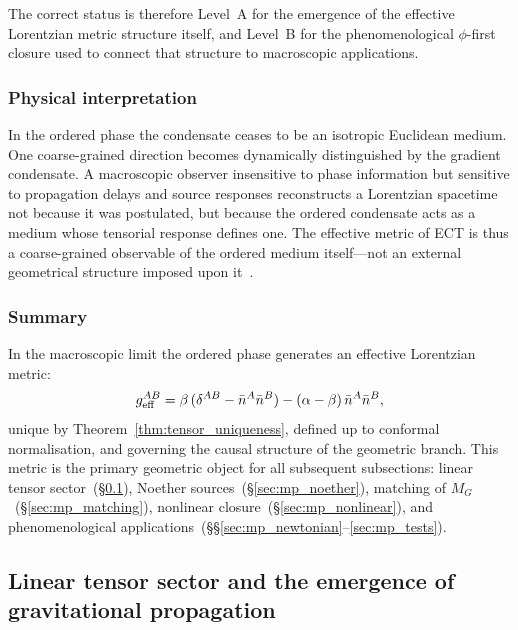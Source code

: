 \documentclass[11pt,a4paper]{article}
\numberwithin{equation}{section}
\begin{document}
The correct status is therefore Level~A for the emergence of the
effective Lorentzian metric structure itself, and Level~B for the
phenomenological $\phi$-first closure used to connect that structure
to macroscopic applications.

\subsubsection*{Physical interpretation}

In the ordered phase the condensate ceases to be an isotropic Euclidean
medium.
One coarse-grained direction becomes dynamically distinguished by the
gradient condensate.
A macroscopic observer insensitive to phase information but sensitive
to propagation delays and source responses reconstructs a Lorentzian
spacetime not because it was postulated, but because the ordered
condensate acts as a medium whose tensorial response defines one.
The effective metric of ECT is thus a coarse-grained observable of the
ordered medium itself---not an external geometrical structure imposed
upon it~\cite{Volovik2003}.

\subsubsection*{Summary}

In the macroscopic limit the ordered phase generates an effective
Lorentzian metric:
\begin{equation}
  \label{eq:geff_summary}
  g_{\rm eff}^{AB}
  = \beta\,(\delta^{AB}-\bar{n}^A\bar{n}^B)
  - (\alpha-\beta)\,\bar{n}^A\bar{n}^B,
\end{equation}
unique by Theorem~\ref{thm:tensor_uniqueness}, defined up to conformal
normalisation, and governing the causal structure of the geometric branch.
This metric is the primary geometric object for all subsequent
subsections: linear tensor sector~(\S\ref{sec:mp_tensor}), Noether
sources~(\S\ref{sec:mp_noether}), matching of $M_G$~(\S\ref{sec:mp_matching}),
nonlinear closure~(\S\ref{sec:mp_nonlinear}), and phenomenological
applications~(\S\S\ref{sec:mp_newtonian}--\ref{sec:mp_tests}).


\subsection{Linear tensor sector and the emergence
of gravitational propagation}
\label{sec:mp_tensor}
\end{document}
